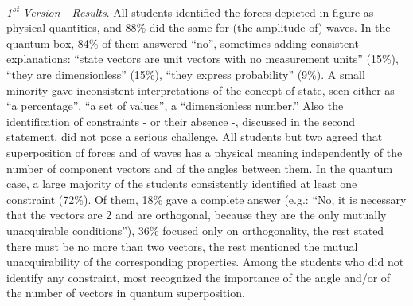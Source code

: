 \documentclass[twocolumn,secnumarabic,amssymb, nobibnotes, aps, prd, nofootinbib]{revtex4-2}
\begin{document}
\emph{1\textsuperscript{st} Version - Results}. All students identified the forces depicted in figure as physical quantities, and 88\% did the same for (the amplitude of) waves. In the quantum box, 84\% of them answered ``no'', sometimes adding consistent explanations: ``state vectors are unit vectors with no measurement units'' (15\%), ``they are dimensionless'' (15\%), ``they express probability'' (9\%). A small minority gave inconsistent interpretations of the concept of state, seen either as ``a percentage'', ``a set of values'', a ``dimensionless number.''
Also the identification of constraints - or their absence -, discussed in the second statement, did not pose a serious challenge. All students but two agreed that superposition of forces and of waves has a physical meaning independently of the number of component vectors and of the angles between them. In the quantum case, a large majority of the students consistently identified at least one constraint (72\%). Of them, 18\% gave a complete answer (e.g.: ``No, it is necessary that the vectors are 2 and are orthogonal, because they are the only mutually unacquirable conditions''), 36\% focused only on orthogonality, the rest stated there must be no more than two vectors, the rest mentioned the mutual unacquirability of the corresponding properties. Among the students who did not identify any constraint, most recognized the importance of the angle and/or of the number of vectors in quantum superposition.
\end{document}
